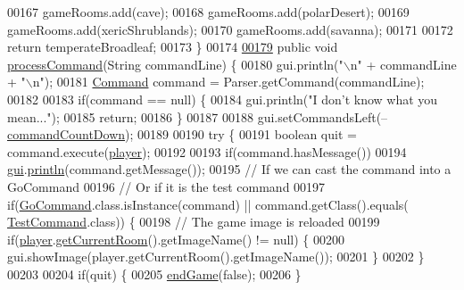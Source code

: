 \begin{DoxyCode}
00167         gameRooms.add(cave);
00168         gameRooms.add(polarDesert);
00169         gameRooms.add(xericShrublands);
00170         gameRooms.add(savanna);
00171 
00172         \textcolor{keywordflow}{return} temperateBroadleaf;
00173     \}
00174 
\hypertarget{GameEngine_8java_source_l00179}{}\hyperlink{classGameEngine_ad7133885f313fa99bca3bb7cb8272f64}{00179}     \textcolor{keyword}{public} \textcolor{keywordtype}{void} \hyperlink{classGameEngine_ad7133885f313fa99bca3bb7cb8272f64}{processCommand}(String commandLine) \{
00180         gui.println(\textcolor{stringliteral}{"\(\backslash\)n"} + commandLine + \textcolor{stringliteral}{"\(\backslash\)n"});
00181         \hyperlink{classpkg__commands_1_1Command}{Command} command = Parser.getCommand(commandLine);
00182 
00183         \textcolor{keywordflow}{if}(command == null) \{
00184             gui.println(\textcolor{stringliteral}{"I don't know what you mean..."});
00185             \textcolor{keywordflow}{return};
00186         \}
00187 
00188         gui.setCommandsLeft(--\hyperlink{classGameEngine_ad4ff8d760eced9c7b76cdeb0dc989975}{commandCountDown});
00189 
00190         \textcolor{keywordflow}{try} \{
00191             \textcolor{keywordtype}{boolean} quit = command.execute(\hyperlink{classGameEngine_a4666c6719428cc43014b30b305eeef5d}{player});
00192 
00193             \textcolor{keywordflow}{if}(command.hasMessage())
00194                 \hyperlink{classGameEngine_a2a7d0bb6183b3f3ef3ee2008926374a0}{gui}.\hyperlink{classUserInterface_a79f606b4b1f5d1523e50eea00039ed94}{println}(command.getMessage());
00195             \textcolor{comment}{// If we can cast the command into a GoCommand}
00196             \textcolor{comment}{// Or if it is the test command}
00197             \textcolor{keywordflow}{if}(\hyperlink{classpkg__commands_1_1GoCommand}{GoCommand}.class.isInstance(command) || command.getClass().equals(
      \hyperlink{classpkg__commands_1_1TestCommand}{TestCommand}.class)) \{
00198                 \textcolor{comment}{// The game image is reloaded}
00199                 \textcolor{keywordflow}{if}(\hyperlink{classGameEngine_a4666c6719428cc43014b30b305eeef5d}{player}.\hyperlink{classpkg__world_1_1Player_a5ff0ede152d97c0c9cf6603c9a422a77}{getCurrentRoom}().getImageName() != null) \{
00200                     gui.showImage(player.getCurrentRoom().getImageName());
00201                 \}
00202             \}
00203 
00204             \textcolor{keywordflow}{if}(quit) \{
00205                 \hyperlink{classGameEngine_a1f5fa36c5dfc36c9a963fe439afc057b}{endGame}(\textcolor{keyword}{false});
00206             \}

\end{DoxyCode}

